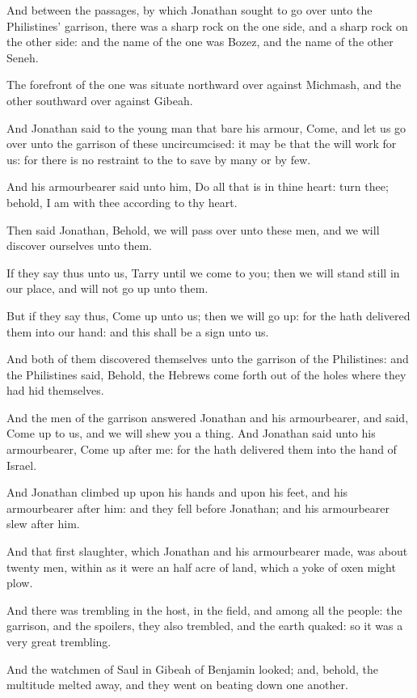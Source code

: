 \Verse And between the passages, by which Jonathan sought to go over unto the Philistines' garrison, there was a sharp rock on the one side, and a sharp rock on the other side: and the name of the one was Bozez, and the name of the other Seneh.

\Verse The forefront of the one was situate northward over against Michmash, and the other southward over against Gibeah.

\Verse And Jonathan said to the young man that bare his armour, Come, and let us go over unto the garrison of these uncircumcised: it may be that the \LORD will work for us: for there is no restraint to the \LORD to save by many or by few.

\Verse And his armourbearer said unto him, Do all that is in thine heart: turn thee; behold, I am with thee according to thy heart.

\Verse Then said Jonathan, Behold, we will pass over unto these men, and we will discover ourselves unto them.

\Verse If they say thus unto us, Tarry until we come to you; then we will stand still in our place, and will not go up unto them.

\Verse But if they say thus, Come up unto us; then we will go up: for the \LORD hath delivered them into our hand: and this shall be a sign unto us.

\Verse And both of them discovered themselves unto the garrison of the Philistines: and the Philistines said, Behold, the Hebrews come forth out of the holes where they had hid themselves.

\Verse And the men of the garrison answered Jonathan and his armourbearer, and said, Come up to us, and we will shew you a thing.  And Jonathan said unto his armourbearer, Come up after me: for the \LORD hath delivered them into the hand of Israel.

\Verse And Jonathan climbed up upon his hands and upon his feet, and his armourbearer after him: and they fell before Jonathan; and his armourbearer slew after him.

\Verse And that first slaughter, which Jonathan and his armourbearer made, was about twenty men, within as it were an half acre of land, which a yoke of oxen might plow.

\Verse And there was trembling in the host, in the field, and among all the people: the garrison, and the spoilers, they also trembled, and the earth quaked: so it was a very great trembling.

\Verse And the watchmen of Saul in Gibeah of Benjamin looked; and, behold, the multitude melted away, and they went on beating down one another.

